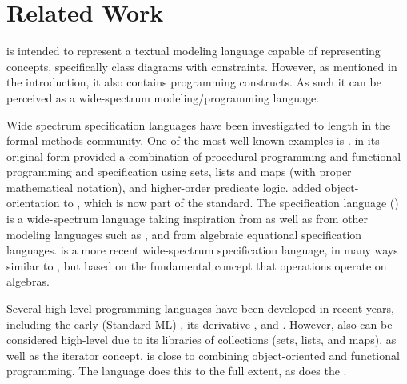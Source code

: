 
\section{Related Work}
\label{sec:related-work}

\Klang{} is intended to represent a textual modeling language capable
of representing \sysml{} concepts, specifically class diagrams with
constraints.  However, as mentioned in the introduction, it also
contains programming constructs.  As such it can be perceived as a
wide-spectrum modeling/programming language.

Wide spectrum specification languages have been investigated to length
in the formal methods community. One of the most well-known examples
is \vdm{} \cite{vdm78,bjoerner-jones-82,jones90,jones-shaw-90}. \vdm{}
in its original form \cite{vdm78} provided a combination of procedural
programming and functional programming and specification using sets,
lists and maps (with proper mathematical notation), and higher-order
predicate logic. \vdmpp{} \cite{vdmplusplus05} added
object-orientation to \vdm{}, which is now part of the \vdm{}
standard. The \raiselang{} specification language (\rsl{})
\cite{raise92} is a wide-spectrum language taking inspiration from
\vdm{} as well as from other modeling languages such as \zlang{}
\cite{spivey-Z-1988}, and from algebraic equational specification
languages. \asml{} \cite{asml05} is a more recent wide-spectrum
specification language, in many ways similar to \vdm{}, but based on
the fundamental concept that operations operate on algebras.

Several high-level programming languages have been developed in recent
years, including the early \sml{} (Standard ML) \cite{standard-ml-97},
its derivative \ocaml{} \cite{ocaml}, and \haskell{}
\cite{haskell}. However, also \java{} can be considered high-level due
to its libraries of collections (sets, lists, and maps), as well as
the iterator concept. \python{} \cite{python} is close to combining
object-oriented and functional programming. The \scala{} \cite{scala}
language does this to the full extent, as does the \fortress{}
\cite{fortress}.

